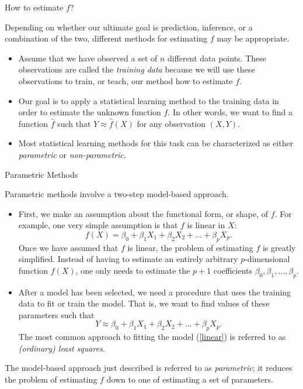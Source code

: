 \documentclass[10pt,a4paper]{beamer}
\begin{document}
\begin{frame}{How to estimate $f$?}

Depending on whether our ultimate goal is prediction, inference, or a
combination of the two, different methods for estimating $f$ may be appropriate.

\begin{itemize}
  \item Assume that we have observed a set of $n$ different
data points. These observations are called the \emph{training data} because we will use these
observations to train, or teach, our method how to estimate $f$.
  \item Our goal is to apply a statistical learning method to the training data
in order to estimate the unknown function $f$. In other words, we want to find a function $\hat{f}$ such that $Y \approx \hat{f}(X)$ for any observation $(X,Y)$.
  \item Most statistical learning methods for this task can be characterized as either \emph{parametric} or \emph{non-parametric}.
\end{itemize}
\end{frame}



\begin{frame}{Parametric Methods}

Parametric methods involve a two-step model-based approach.

\begin{itemize}
  \item First, we make an assumption about the functional form, or shape,
of $f$. For example, one very simple assumption is that $f$ is linear in $X$:
\begin{equation}\label{linear}
  f(X)= \beta_0 +\beta_1 X_1 +\beta_2 X_2 + \dots + \beta_p X_p.
\end{equation}
Once we have assumed that $f$ is linear, the problem of estimating $f$ is greatly simplified. Instead of having to estimate an entirely
arbitrary $p$-dimensional function $f(X)$, one only needs to estimate
the $p+1$ coefficients $\beta_0,\beta_1,\dots,\beta_p$.
  \item After a model has been selected, we need a procedure that uses the
training data to fit or train the model. That is, we want to find values of these parameters such that
\begin{equation}\label{}
  Y \approx \beta_0 +\beta_1 X_1 +\beta_2 X_2 + \dots + \beta_p X_p.
\end{equation}
The most common approach to fitting the model (\ref{linear}) is referred to as \emph{(ordinary) least squares}.
\end{itemize}
The model-based approach just described is referred to as \emph{parametric};
it reduces the problem of estimating $f$ down to one of estimating a set of parameters.

\end{frame}
\end{document}
